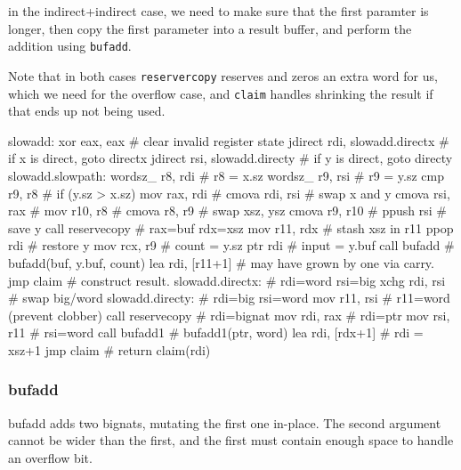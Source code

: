 in the indirect+indirect case, we need to make sure that the first
paramter is longer, then copy the first parameter into a result buffer,
and perform the addition using \lstinline|bufadd|.

Note that in both cases \lstinline|reservercopy| reserves and zeros
an extra word for us, which we need for the overflow case, and
\lstinline|claim| handles shrinking the result if that ends up not
being used.

\begin{asm}
slowadd:
	xor	eax, eax                    # clear invalid register state
	jdirect	rdi, slowadd.directx        # if x is direct, goto directx
	jdirect	rsi, slowadd.directy        # if y is direct, goto directy
slowadd.slowpath:
	wordsz_	r8, rdi                     # r8 = x.sz
	wordsz_	r9, rsi                     # r9 = y.sz
	cmp	r9, r8                      # if (y.sz > x.sz)
	mov	rax, rdi                    #
	cmova	rdi, rsi                    #     swap x and y
	cmova	rsi, rax                    #
	mov	r10, r8                     #
	cmova	r8, r9                      #     swap xsz, ysz
	cmova	r9, r10                     #
	ppush	rsi                         # save y
	call	reservecopy                 # rax=buf rdx=xsz
	mov	r11, rdx                    # stash xsz in r11
	ppop	rdi                         # restore y
	mov	rcx, r9                     # count = y.sz
	ptr	rdi                         # input = y.buf
	call	bufadd                      # bufadd(buf, y.buf, count)
	lea	rdi, [r11+1]                # may have grown by one via carry.
	jmp	claim                       # construct result.
slowadd.directx:                            # rdi=word rsi=big
	xchg	rdi, rsi                    #   swap big/word
slowadd.directy:                            # rdi=big rsi=word
	mov	r11, rsi                    #   r11=word (prevent clobber)
	call	reservecopy                 #   rdi=bignat
	mov	rdi, rax                    #   rdi=ptr
	mov	rsi, r11                    #   rsi=word
	call	bufadd1                     #   bufadd1(ptr, word)
	lea	rdi, [rdx+1]                #   rdi = xsz+1
	jmp	claim                       #   return claim(rdi)
\end{asm}

\subsubsection{bufadd}

bufadd adds two bignats, mutating the first one in-place.  The second
argument cannot be wider than the first, and the first must contain
enough space to handle an overflow bit.

